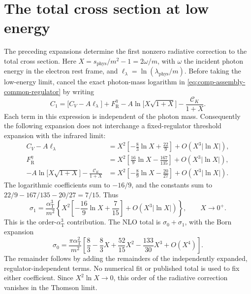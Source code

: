 \section{The total cross section at low energy}
\label{sec:comp-independent-total-low}
The preceding expansions determine the first nonzero radiative
correction to the total cross section. Here
$X=s_{\mathrm{phys}}/m^2-1=2\omega/m$, with $\omega$ the incident
photon energy in the electron rest frame, and
$\ell_\lambda=\ln(\lambda_{\mathrm{phys}}/m)$.
Before taking the low-energy limit, cancel the exact photon-mass
logarithm in \eqref{eq:comp-assembly-common-regulator} by writing
\begin{equation}
 C_1=\bigl[C_V-A\ell_\lambda\bigr]+F_{\mathrm R}^{\eta}
       -A\ln\bigl[X\sqrt{1+X}\bigr]-\frac{\mathcal C_K}{1+X}.
\end{equation}
Each term in this expression is independent of the photon mass.
Consequently the following expansion does not interchange a
fixed-regulator threshold expansion with the infrared limit:
\begin{align}
 C_V-A\ell_\lambda
 &=X^2\left[-\frac83\ln X+\frac{22}{9}\right]
       +O\!\left(X^3|\ln X|\right),\\
 F_{\mathrm R}^{\eta}
 &=X^2\left[\frac{16}{9}\ln X-\frac{167}{135}\right]
       +O\!\left(X^3|\ln X|\right),\\
 -A\ln\bigl[X\sqrt{1+X}\bigr]-\frac{\mathcal C_K}{1+X}
 &=X^2\left[-\frac89\ln X-\frac{20}{27}\right]
       +O\!\left(X^3|\ln X|\right).
\end{align}
The logarithmic coefficients sum to $-16/9$, and the constants sum
to $22/9-167/135-20/27=7/15$. Thus
\begin{equation}
 \boxed{\sigma_1=\frac{\alpha_{\mathrm T}^3}{m^2}
 \left\{X^2\left[-\frac{16}{9}\ln X+\frac7{15}\right]
       +O\!\left(X^3|\ln X|\right)\right\},\qquad X\to0^+.}
 \label{eq:comp-independent-total-low}
\end{equation}
This is the order-$\alpha_{\mathrm T}^3$ contribution. The NLO total
is $\sigma_0+\sigma_1$, with the Born expansion
\begin{equation}
 \sigma_0=\frac{\pi\alpha_{\mathrm T}^2}{m^2}
 \left[\frac83-\frac83X+\frac{52}{15}X^2
                   -\frac{133}{30}X^3+O(X^4)\right].
\end{equation}
The remainder follows by adding the remainders of the independently
expanded, regulator-independent terms. No numerical fit or published
total is used to fix either coefficient. Since $X^2\ln X\to0$, this
order of the radiative correction vanishes in the Thomson limit.

